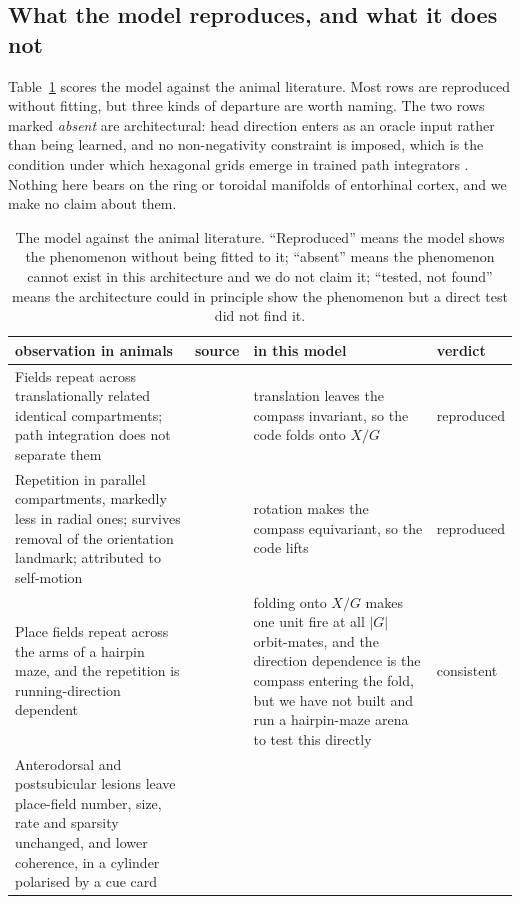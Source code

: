 \documentclass[9pt,lineno]{elife}
\begin{document}
\subsection*{What the model reproduces, and what it does not}

Table~\ref{tab:bio} scores the model against the animal literature. Most rows are reproduced without
fitting, but three kinds of departure are worth naming. The two rows marked \emph{absent} are
architectural: head direction enters as an oracle input rather than being learned, and no non-negativity
constraint is imposed, which is the condition under which hexagonal grids emerge in trained path
integrators \citep{sorscher2023unified}. Nothing here bears on the ring or toroidal manifolds of
entorhinal cortex, and we make no claim about them.

\begin{table}[t]
\centering
\small
\setlength{\tabcolsep}{4pt}
\caption{The model against the animal literature. ``Reproduced'' means the model shows the
phenomenon without being fitted to it; ``absent'' means the phenomenon cannot exist in this
architecture and we do not claim it; ``tested, not found'' means the architecture could in
principle show the phenomenon but a direct test did not find it.}
\label{tab:bio}
\begin{tabular}{p{}p{}p{}p{}}
\toprule
observation in animals & source & in this model & verdict \\
\midrule
Fields repeat across translationally related identical compartments; path integration does not
separate them
& \citet{spiers2015} & translation leaves the compass invariant, so the code folds onto $X/G$
& reproduced \\[4pt]
Repetition in parallel compartments, markedly less in radial ones; survives removal of the
orientation landmark; attributed to self-motion
& \citet{grieves2016} & rotation makes the compass equivariant, so the code lifts
& reproduced \\[4pt]
Place fields repeat across the arms of a hairpin maze, and the repetition is
running-direction dependent
& \citet{derdikman2009} & folding onto $X/G$ makes one unit fire at all $|G|$ orbit-mates, and
the direction dependence is the compass entering the fold, but we have not built and run a
hairpin-maze arena to test this directly
& consistent \\[4pt]
Anterodorsal and postsubicular lesions leave place-field number, size, rate and sparsity
unchanged, and lower coherence, in a cylinder polarised by a cue card

\end{tabular}
\end{table}
\end{document}
